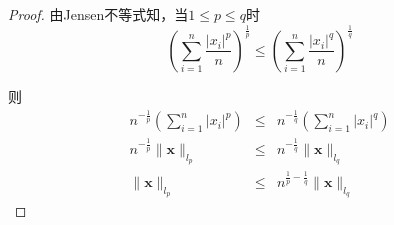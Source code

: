 \documentclass{ctexart}
\begin{document}
\begin{enumerate}
\begin{proof}
由Jensen不等式知，当\(1 \leq p \leq q\)时
\[
(\sum^n_{i=1} \frac{|x_i|^p}{n} )^{\frac{1}{p}}\leq (\sum^n_{i=1} \frac{|x_i|^q}{n} )^{\frac{1}{q}}
\]

则
\begin{eqnarray*}
n^{-\frac{1}{p}} (\sum^n_{i=1} |x_i|^p) & \leq & n^{-\frac{1}{q}} (\sum^n_{i=1} |x_i|^q) \\
n^{-\frac{1}{p}} \| \bm{x}\|_{l_p} & \leq & n^{-\frac{1}{q}} \| \bm{x}\|_{l_q} \\
\| \bm{x} \|_{l_p} & \leq & n^{\frac{1}{p}-\frac{1}{q}} \| \bm{x}\|_{l_q} 
\end{eqnarray*}

\end{proof}
\end{enumerate}
\end{document}
